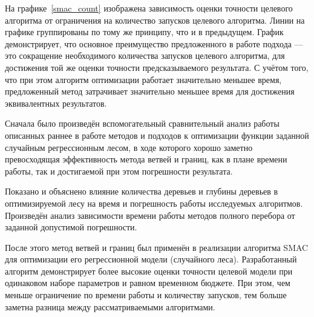 На графике~\cref{smac_count} изображена зависимость оценки точности целевого
алгоритма от ограничения на количество запусков целевого алгоритма. Линии на
графике группированы по тому же принципу, что и в предыдущем. График
демонстрирует, что основное преимущество предложенного в работе подхода --- это
сокращение необходимого количества запусков целевого алгоритма, для достижения
той же оценки точности предсказываемого результата. С учётом того, что при этом
алгоритм оптимизации работает значительно меньшее время, предложенный метод
затрачивает значительно меньшее время для достижения эквивалентных результатов.

\chapterconclusion{}

Сначала было произведён вспомогательный сравнительный анализ работы описанных
раннее в работе методов и подходов к оптимизации функции заданной случайным
регрессионным лесом, в ходе которого хорошо заметно превосходящая эффективность
метода ветвей и границ, как в плане времени работы, так и достигаемой при этом
погрешности результата.

Показано и объяснено влияние количества деревьев и глубины деревьев
в оптимизируемой лесу на время и погрешность работы исследуемых алгоритмов.
Произведён анализ зависимости времени работы методов полного перебора от
заданной допустимой погрешности.

После этого метод ветвей и границ был применён в реализации алгоритма SMAC для
оптимизации его регрессионной модели (случайного леса). Разработанный алгоритм
демонстрирует более высокие оценки точности целевой модели при одинаковом наборе
параметров и равном временном бюджете. При этом, чем меньше ограничение по
времени работы и количеству запусков, тем больше заметна разница между
рассматриваемыми алгоритмами.
